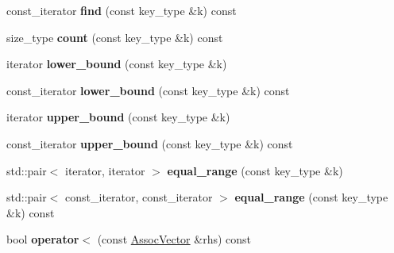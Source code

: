 \begin{DoxyCompactItemize}
\item 
\hypertarget{classLoki_1_1AssocVector_a6012113cc489beba4ce1d880a28da077}{}const\+\_\+iterator {\bfseries find} (const key\+\_\+type \&k) const \label{classLoki_1_1AssocVector_a6012113cc489beba4ce1d880a28da077}

\item 
\hypertarget{classLoki_1_1AssocVector_a39771dacfc44f25db115eda327d2895b}{}size\+\_\+type {\bfseries count} (const key\+\_\+type \&k) const \label{classLoki_1_1AssocVector_a39771dacfc44f25db115eda327d2895b}

\item 
\hypertarget{classLoki_1_1AssocVector_a08130500bbfcde71415b5a0f6f384722}{}iterator {\bfseries lower\+\_\+bound} (const key\+\_\+type \&k)\label{classLoki_1_1AssocVector_a08130500bbfcde71415b5a0f6f384722}

\item 
\hypertarget{classLoki_1_1AssocVector_ab0c1f71a9e28a13a37fbdef4b02dc430}{}const\+\_\+iterator {\bfseries lower\+\_\+bound} (const key\+\_\+type \&k) const \label{classLoki_1_1AssocVector_ab0c1f71a9e28a13a37fbdef4b02dc430}

\item 
\hypertarget{classLoki_1_1AssocVector_a9355ff61b02ab498e2452beec6c50868}{}iterator {\bfseries upper\+\_\+bound} (const key\+\_\+type \&k)\label{classLoki_1_1AssocVector_a9355ff61b02ab498e2452beec6c50868}

\item 
\hypertarget{classLoki_1_1AssocVector_a7377f8cfbfd38efd189562e94e1c3dc1}{}const\+\_\+iterator {\bfseries upper\+\_\+bound} (const key\+\_\+type \&k) const \label{classLoki_1_1AssocVector_a7377f8cfbfd38efd189562e94e1c3dc1}

\item 
\hypertarget{classLoki_1_1AssocVector_af5338dfe00126ab30dbd9ca4cd001044}{}std\+::pair$<$ iterator, iterator $>$ {\bfseries equal\+\_\+range} (const key\+\_\+type \&k)\label{classLoki_1_1AssocVector_af5338dfe00126ab30dbd9ca4cd001044}

\item 
\hypertarget{classLoki_1_1AssocVector_a170455ca74f514ed73571782127e0835}{}std\+::pair$<$ const\+\_\+iterator, const\+\_\+iterator $>$ {\bfseries equal\+\_\+range} (const key\+\_\+type \&k) const \label{classLoki_1_1AssocVector_a170455ca74f514ed73571782127e0835}

\item 
\hypertarget{classLoki_1_1AssocVector_aa4a7abc35dc11049f8b1163a9dd14726}{}bool {\bfseries operator$<$} (const \hyperlink{classLoki_1_1AssocVector}{Assoc\+Vector} \&rhs) const \label{classLoki_1_1AssocVector_aa4a7abc35dc11049f8b1163a9dd14726}

\end{DoxyCompactItemize}
